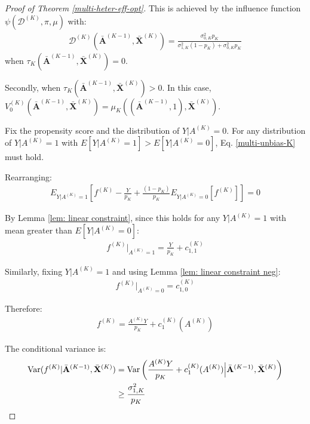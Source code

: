 \documentclass[11pt]{article}
\theoremstyle{referenceplain}
\theoremstyle{referencedefinition}
\theoremstyle{referenceremark}
\begin{document}
\begin{proof}[Proof of Theorem \ref{multi-heter-eff-opt}]
This is achieved by the influence function $\psi(\mathcal{D}^{(K)}, \pi, \mu)$ with:
\begin{align}\label{multi-D-K-tau0-opt}
    \mathcal{D}^{(K)}(\bar{\mathbf{A}}^{(K-1)}, \bar{\mathbf{X}}^{(K)}) = \frac{\sigma_{0,K}^2 p_K}{\sigma_{1,K}^2 (1-p_K) + \sigma_{0,K}^2 p_K}
\end{align}
when $\tau_K(\bar{\mathbf{A}}^{(K-1)}, \bar{\mathbf{X}}^{(K)}) = 0$.

Secondly, when $\tau_K(\bar{\mathbf{A}}^{(K-1)}, \allowbreak\bar{\mathbf{X}}^{(K)}) > 0$. In this case, $V_0^{(K)}(\bar{\mathbf{A}}^{(K-1)}, \allowbreak\bar{\mathbf{X}}^{(K)}) \allowbreak= \mu_K((\bar{\mathbf{A}}^{(K-1)}, 1), \allowbreak\bar{\mathbf{X}}^{(K)})$.

Fix the propensity score and the distribution of $Y | A^{(K)} = 0$. For any distribution of $Y | A^{(K)} = 1$ with $E[Y | A^{(K)} = 1] > E[Y | A^{(K)} = 0]$, Eq. \eqref{multi-unbias-K} must hold.

Rearranging:
\begin{align*}
    E_{Y|A^{(K)}=1}\left[f^{(K)} - \frac{Y}{p_K} + \frac{(1-p_K)}{p_K} E_{Y|A^{(K)}=0}[f^{(K)}]\right] = 0
\end{align*}

By Lemma \ref{lem: linear constraint}, since this holds for any $Y | A^{(K)} = 1$ with mean greater than $E[Y | A^{(K)} = 0]$:
\begin{align}\label{multi-f-K-1-tau+}
    f^{(K)}|_{A^{(K)}=1} = \frac{Y}{p_K} + c_{1,1}^{(K)}
\end{align}

Similarly, fixing $Y | A^{(K)} = 1$ and using Lemma \ref{lem: linear constraint neg}:
\begin{align}\label{multi-f-K-0-tau+}
    f^{(K)}|_{A^{(K)}=0} = c_{1,0}^{(K)}
\end{align}

Therefore:
\begin{align}\label{multi-f-K-tau+}
    f^{(K)} = \frac{A^{(K)} Y}{p_K} + c_1^{(K)}(A^{(K)})
\end{align}

The conditional variance is:
\begin{align}
    \operatorname{Var}(f^{(K)} | \bar{\mathbf{A}}^{(K-1)}, \bar{\mathbf{X}}^{(K)}) &= \operatorname{Var}\left(\frac{A^{(K)} Y}{p_K} + c_1^{(K)}(A^{(K)}) \Big| \bar{\mathbf{A}}^{(K-1)}, \bar{\mathbf{X}}^{(K)}\right) \notag\\
    &\geq \frac{\sigma_{1,K}^2}{p_K} \label{multi-var-lb-K-tau+}
\end{align}


\end{proof}
\end{document}
